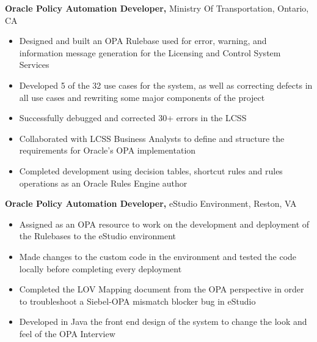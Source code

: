 \documentclass[margin]{res}
\begin{document}
\begin{resume}
{\bf Oracle Policy Automation Developer,} Ministry Of Transportation, Ontario, CA
\begin{itemize} \itemsep -2pt %
\item Designed and built an OPA Rulebase used for error, warning, and
				information message generation for the
				Licensing and Control System Services 
\item Developed 5 of the 32 use cases for the system, as well as correcting
 				defects in all use cases and rewriting some 
 				major components of the project
\item Successfully debugged and corrected 30+ errors in the LCSS
\item Collaborated with LCSS Business Analysts to define and structure the
				requirements for Oracle's OPA implementation
\item Completed development using decision tables, shortcut rules
				and rules operations as an Oracle Rules Engine author
\end{itemize}

{\bf Oracle Policy Automation Developer,} eStudio Environment, Reston, VA
\begin{itemize} \itemsep -2pt
\item Assigned as an OPA resource to work on the development and 
				deployment of the Rulebases to the eStudio environment
\item Made changes to the custom code in the environment and tested the
				code locally before completing every deployment
\item Completed the LOV Mapping document from the OPA perspective 
				in order to troubleshoot a Siebel-OPA mismatch blocker 
				bug in eStudio
\item Developed in Java the front end design of the system to change 
				the look and feel of the OPA Interview

\end{itemize}
 

\end{resume}
\end{document}
